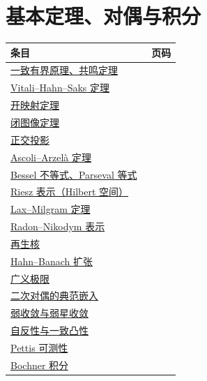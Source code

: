 \section*{基本定理、对偶与积分}
\begin{longtable}{p{0.80\linewidth}r}
\toprule 条目 & 页码\\\midrule\endhead
\hyperref[sec:yosida-02-01]{一致有界原理、共鸣定理} & \pageref{sec:yosida-02-01}\\
\hyperref[sec:yosida-02-02]{Vitali--Hahn--Saks 定理} & \pageref{sec:yosida-02-02}\\
\hyperref[sec:yosida-02-05]{开映射定理} & \pageref{sec:yosida-02-05}\\
\hyperref[sec:yosida-02-06]{闭图像定理} & \pageref{sec:yosida-02-06}\\
\hyperref[sec:yosida-03-01]{正交投影} & \pageref{sec:yosida-03-01}\\
\hyperref[sec:yosida-03-03]{Ascoli--Arzelà 定理} & \pageref{sec:yosida-03-03}\\
\hyperref[sec:yosida-03-04]{Bessel 不等式、Parseval 等式} & \pageref{sec:yosida-03-04}\\
\hyperref[sec:yosida-03-06]{Riesz 表示（Hilbert 空间）} & \pageref{sec:yosida-03-06}\\
\hyperref[sec:yosida-03-07]{Lax--Milgram 定理} & \pageref{sec:yosida-03-07}\\
\hyperref[sec:yosida-03-08]{Radon--Nikodym 表示} & \pageref{sec:yosida-03-08}\\
\hyperref[sec:yosida-03-09]{再生核} & \pageref{sec:yosida-03-09}\\
\hyperref[sec:yosida-04-01]{Hahn--Banach 扩张} & \pageref{sec:yosida-04-01}\\
\hyperref[sec:yosida-04-02]{广义极限} & \pageref{sec:yosida-04-02}\\
\hyperref[sec:yosida-04-08]{二次对偶的典范嵌入} & \pageref{sec:yosida-04-08}\\
\hyperref[sec:yosida-05-01]{弱收敛与弱星收敛} & \pageref{sec:yosida-05-01}\\
\hyperref[sec:yosida-05-02]{自反性与一致凸性} & \pageref{sec:yosida-05-02}\\
\hyperref[sec:yosida-05-04]{Pettis 可测性} & \pageref{sec:yosida-05-04}\\
\hyperref[sec:yosida-05-05]{Bochner 积分} & \pageref{sec:yosida-05-05}\\
\bottomrule
\end{longtable}

